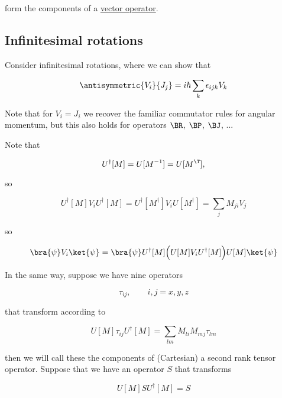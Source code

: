 form the components of a \underline{vector operator}.

\subsection{Infinitesimal rotations}

Consider infinitesimal rotations, where we can show that

\begin{equation}\label{eqn:qmTwoL19:n}
\antisymmetric{V_i}{J_j} = i \hbar \sum_k \epsilon_{ijk} V_k
\end{equation}

Note that for $V_i = J_i$ we recover the familiar commutator rules for angular momentum, but this also holds for operators $\BR$, $\BP$, $\BJ$, ...

Note that

\begin{equation}\label{eqn:qmTwoL19:n}
U^\dagger[M] = U[M^{-1}] = U[M^\T],
\end{equation}

so

\begin{equation}\label{eqn:qmTwoL19:n}
U^\dagger[M] V_i U^\dagger[M] = U^\dagger[M^\dagger] V_i U[M^\dagger] = \sum_j M_{ji} V_j
\end{equation}

so

\begin{equation}\label{eqn:qmTwoL19:n}
\bra{\psi} V_i \ket{\psi}
=
\bra{\psi}
U^\dagger[M] \Bigl( U[M] V_i U^\dagger[M] \Bigr) U[M]
\ket{\psi}
\end{equation}

In the same way, suppose we have nine operators

\begin{equation}\label{eqn:qmTwoL19:n}
\tau_{ij}, \qquad i, j = x, y, z
\end{equation}

that transform according to

\begin{equation}\label{eqn:qmTwoL19:n}
U[M] \tau_{ij} U^\dagger[M] = \sum_{lm} M_{li} M_{mj} \tau_{lm}
\end{equation}

then we will call these the components of (Cartesian) a second rank tensor operator.  Suppose that we have an operator $S$ that transforms

\begin{equation}\label{eqn:qmTwoL19:n}
U[M] S U^\dagger[M] = S
\end{equation}

